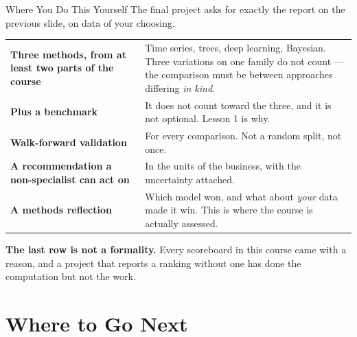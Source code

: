 \documentclass[aspectratio=169, 11pt]{beamer}
\begin{document}
\begin{frame}{Where You Do This Yourself}
  The final project asks for exactly the report on the previous slide, on data of your choosing.

  \begin{center}
    {\small
    \begin{tabular}{p{3.6cm}p{8.7cm}}
      \toprule
      \textbf{Three methods, from at least two parts of the course} & Time series, trees, deep
      learning, Bayesian. Three variations on one family do not count --- the comparison must be
      between approaches differing \emph{in kind}. \\[3pt]
      \textbf{Plus a benchmark} & It does not count toward the three, and it is not optional.
      Lesson 1 is why. \\[3pt]
      \textbf{Walk-forward validation} & For every comparison. Not a random split, not once. \\[3pt]
      \textbf{A recommendation a non-specialist can act on} & In the units of the business, with
      the uncertainty attached. \\[3pt]
      \textbf{A methods reflection} & Which model won, and what about \emph{your} data made it
      win. This is where the course is actually assessed. \\
      \bottomrule
    \end{tabular}
    }
  \end{center}

  \vspace{-0.05cm}
  \textbf{The last row is not a formality.} Every scoreboard in this course came with a reason,
  and a project that reports a ranking without one has done the computation but not the work.
\end{frame}

\section{Where to Go Next}

\end{document}
